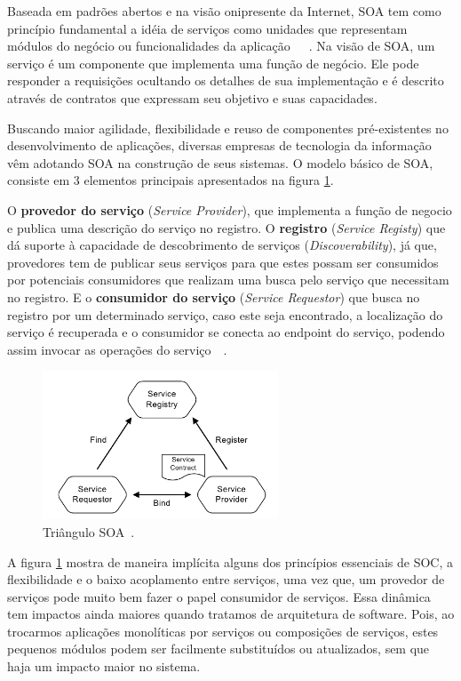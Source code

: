 Baseada em padrões abertos e na visão onipresente da Internet, SOA tem como princípio fundamental a idéia de serviços como unidades que representam módulos do negócio ou funcionalidades da aplicação~\cite{erl2008soa}~\cite{imb2007soa}~\cite{cervantes2005technical}. Na visão de SOA, um serviço é um componente que implementa uma função de negócio. Ele pode responder a requisições ocultando os detalhes de sua implementação e é descrito através de contratos que expressam seu objetivo e suas capacidades. 

Buscando maior agilidade, flexibilidade e reuso de componentes pré-existentes no desenvolvimento de aplicações, diversas empresas de tecnologia da informação vêm adotando SOA na construção de seus sistemas. O modelo básico de SOA, consiste em 3 elementos principais apresentados na figura \ref{fig:soatriangle}.

O \textbf{provedor do serviço} (\textit{Service Provider}), que implementa a função de negocio e publica uma descrição do serviço no registro. O \textbf{registro} (\textit{Service Registy}) que dá suporte à capacidade de descobrimento de serviços (\textit{Discoverability}), já que, provedores tem de publicar seus serviços para que estes possam ser consumidos por potenciais consumidores que realizam uma busca pelo serviço que necessitam no registro. E o \textbf{consumidor do serviço} (\textit{Service Requestor}) que busca no registro por um determinado serviço, caso este seja encontrado, a localização do serviço é recuperada e o consumidor se conecta ao endpoint do serviço, podendo assim invocar as operações do serviço~\cite{michlmayr2007towards}~\cite{huhns2005service}.

\begin{figure}[htp]
\centering
\includegraphics[width=7cm]{chapters/intro/soa_triangle.png}
\caption[Triângulo SOA]{Triângulo SOA~\cite{michlmayr2009end}.}
\label{fig:soatriangle}
\end{figure}

A figura \ref{fig:soatriangle} mostra de maneira implícita alguns dos princípios essenciais de SOC, a flexibilidade e o baixo acoplamento entre serviços, uma vez que, um provedor de serviços pode muito bem fazer o papel consumidor de serviços. Essa dinâmica tem impactos ainda maiores quando tratamos de arquitetura de software. Pois, ao trocarmos aplicações monolíticas por serviços ou composições de serviços, estes pequenos módulos podem ser facilmente substituídos ou atualizados, sem que haja um impacto maior no sistema.

